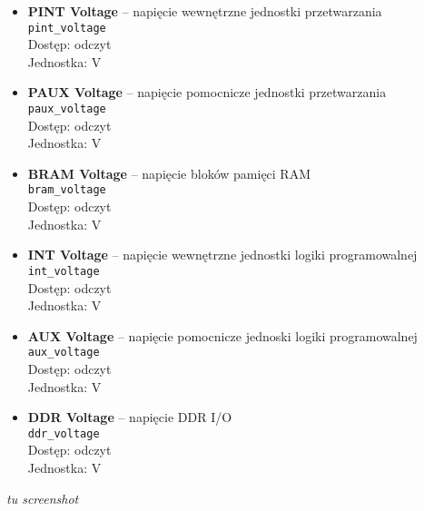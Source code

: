 \documentclass[12pt,a4paper]{article}
\begin{document}
	\begin{itemize}
		\item \textbf{PINT Voltage} -- napięcie wewnętrzne jednostki przetwarzania\\
			  \texttt{pint\_voltage}\\
			  Dostęp: odczyt\\
			  Jednostka: V
		\item \textbf{PAUX Voltage} -- napięcie pomocnicze jednostki przetwarzania\\
			  \texttt{paux\_voltage}\\
			  Dostęp: odczyt\\
			  Jednostka: V
		\item \textbf{BRAM Voltage} -- napięcie bloków pamięci RAM\\
			  \texttt{bram\_voltage}\\
			  Dostęp: odczyt\\
			  Jednostka: V
		\item \textbf{INT Voltage} -- napięcie wewnętrzne jednostki logiki programowalnej\\
			  \texttt{int\_voltage}\\
			  Dostęp: odczyt\\
			  Jednostka: V
		\item \textbf{AUX Voltage} -- napięcie pomocnicze jednoski logiki programowalnej\\
			  \texttt{aux\_voltage}\\
			  Dostęp: odczyt\\
			  Jednostka: V
		\item \textbf{DDR Voltage} -- napięcie DDR I/O\\
			  \texttt{ddr\_voltage}\\
			  Dostęp: odczyt\\
			  Jednostka: V
	\end{itemize}
	\emph{tu screenshot}
\end{document}
